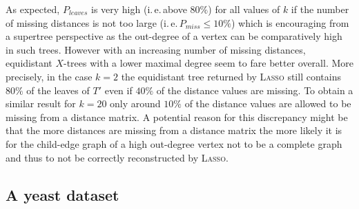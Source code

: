 As expected, $P_{leaves}$ is very high (i.\,e.\,above $80\%$) for all values
of $k$ if the number of missing distances is not too large
(i.\,e.\,$P_{miss}\leq 10\%$) which is encouraging from a supertree
perspective as the out-degree of a vertex can be comparatively high in such
trees.  However with an increasing number of missing distances, equidistant
$X$-trees with a lower maximal degree seem to fare better overall. More
precisely, in the case $k=2$ the equidistant tree returned by \textsc{Lasso}
still contains $80\%$ of the leaves of $T'$ even if $40\%$ of the distance
values are missing. To obtain a similar result for $k=20$ only around $10\%$
of the distance values are allowed to be missing from a distance matrix.  A
potential reason for this discrepancy might be that the more distances are
missing from a distance matrix the more likely it is for the child-edge graph
of a high out-degree vertex not to be a complete graph and thus to not be
correctly reconstructed by \textsc{Lasso}.

\subsection{A yeast dataset}

